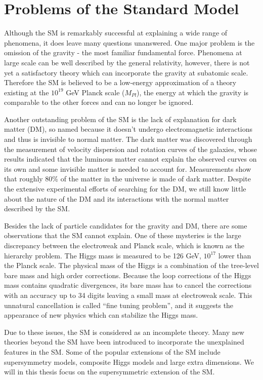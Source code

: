 \documentclass[thesis.tex]{subfiles}
\begin{document}
\section{Problems of the Standard Model}
Although the SM is remarkably successful at explaining a wide range of phenomena, it does leave many questions unanswered. 
One major problem is the omission of the gravity - the most familiar fundamental force. 
Phenomena at large scale can be well described by the general relativity, however, there is not yet a satisfactory theory which can incorporate the gravity at subatomic scale. 
Therefore the SM is believed to be a low-energy approximation of a theory existing at the $10^{19}$ GeV Planck scale ($M_{Pl}$), the energy at which the gravity is comparable to the other forces and can no longer be ignored.

Another outstanding problem of the SM is the lack of explanation for dark matter (DM), so named because it doesn't undergo electromagnetic interactions and thus is invisible to normal matter. The dark matter was discovered through the measurement of velocity dispersion and rotation curves of the galaxies, whose results indicated that the luminous matter cannot explain the observed curves on its own and some invisible matter is needed to account for. Measurements show that roughly 80\% of the matter in the universe is made of dark matter. Despite the extensive experimental efforts of searching for the DM, we still know little about the nature of the DM and its interactions with the normal matter described by the SM. 

Besides the lack of particle candidates for the gravity and DM, there are some observations that the SM  cannot explain. 
One of these mysteries is the large discrepancy between the electroweak and Planck scale, which is known as the hierarchy problem. 
The Higgs mass is measured to be 126 GeV, $10^{17}$ lower than the Planck scale. 
The physical mass of the Higgs is a combination of the tree-level bare mass and high order corrections. 
Because the loop corrections of the Higgs mass contains quadratic divergences, its bare mass has to cancel the corrections with an accuracy up to 34 digits leaving a small mass at electroweak scale. 
This unnatural cancellation is called ``fine tuning problem'', and it suggests the appearance of new physics which can stabilize the Higgs mass.

Due to these issues, the SM is considered as an incomplete theory.
Many new theories beyond the SM have been introduced to incorporate the unexplained features in the SM. 
Some of the popular extensions of the SM include supersymmetry models, composite Higgs models and large extra dimensions.
We will in this thesis focus on the supersymmetric extension of the SM.    
\end{document}
